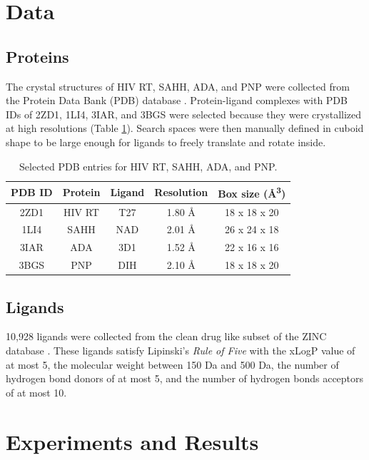 \documentclass[10pt, conference, compsocconf]{IEEEtran}
\begin{document}
\section{Data}

\subsection{Proteins}

The crystal structures of HIV RT, SAHH, ADA, and PNP were collected from the Protein Data Bank (PDB) database \cite{539,537}. Protein-ligand complexes with PDB IDs of 2ZD1, 1LI4, 3IAR, and 3BGS were selected because they were crystallized at high resolutions (Table \ref{tab:SelectedPDBEntries}). Search spaces were then manually defined in cuboid shape to be large enough for ligands to freely translate and rotate inside.

\begin{table}
\centering
\begin{tabular*}
{\linewidth}
{@{\extracolsep{\fill}}ccccc}
\toprule
PDB ID & Protein & Ligand & Resolution & Box size (\AA\textsuperscript{3})\\
\midrule
2ZD1 & HIV RT & T27 & 1.80 \AA & 18 x 18 x 20\\
1LI4 & SAHH   & NAD & 2.01 \AA & 26 x 24 x 18\\
3IAR & ADA    & 3D1 & 1.52 \AA & 22 x 16 x 16\\
3BGS & PNP    & DIH & 2.10 \AA & 18 x 18 x 20\\
\bottomrule
\end{tabular*}
\caption{Selected PDB entries for HIV RT, SAHH, ADA, and PNP.}
\label{tab:SelectedPDBEntries}
\end{table}

\subsection{Ligands}

10,928 ligands were collected from the clean drug like subset of the ZINC database \cite{532}. These ligands satisfy Lipinski's \textit{Rule of Five} \cite{169} with the xLogP value of at most 5, the molecular weight between 150 Da and 500 Da, the number of hydrogen bond donors of at most 5, and the number of hydrogen bonds acceptors of at most 10.

\section{Experiments and Results}
\end{document}
